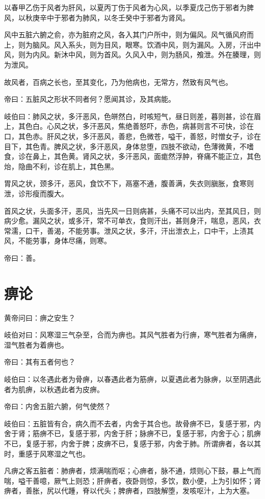 \documentclass{article}%
\begin{document}
以春甲乙伤于风者为肝风，以夏丙丁伤于风者为心风，以季夏戊己伤于邪者为脾风，以秋庚辛中于邪者为肺风，以冬壬癸中于邪者为肾风。

风中五脏六腑之俞，亦为脏府之风，各入其门户所中，则为偏风。风气循风府而上，则为脑风。风入系头，则为目风，眼寒。饮酒中风，则为漏风。入房，汗出中风，则为内风。新沐中风，则为首风。久风入中，则为肠风，飧泄。外在腠理，则为泄风。

故风者，百病之长也，至其变化，乃为他病也，无常方，然致有风气也。

帝曰：五脏风之形状不同者何？愿闻其诊，及其病能。

岐伯曰：肺风之状，多汗恶风，色皏然白，时咳短气，昼日则差，暮则甚，诊在眉上，其色白。心风之状，多汗恶风，焦绝善怒吓，赤色，病甚则言不可快，诊在口，其色赤。肝风之状，多汗恶风，善悲，色微苍，嗌干，善怒，时憎女子，诊在目下，其色青。脾风之状，多汗恶风，身体怠堕，四肢不欲动，色薄微黄，不嗜食，诊在鼻上，其色黄。肾风之状，多汗恶风，面痝然浮肿，脊痛不能正立，其色炲，隐曲不利，诊在肌上，其色黑。

胃风之状，颈多汗，恶风，食饮不下，鬲塞不通，腹善满，失衣则䐜胀，食寒则泄，诊形瘦而腹大。

首风之状，头面多汗，恶风，当先风一日则病甚，头痛不可以出内，至其风日，则病少愈。漏风之状，或多汗，常不可单衣，食则汗出，甚则身汗，喘息，恶风，衣常濡，口干，善渴，不能劳事。泄风之状，多汗，汗出泄衣上，口中干，上渍其风，不能劳事，身体尽痛，则寒。

帝曰：善。
\section{痹论}
黄帝问曰：痹之安生？

岐伯对曰：风寒湿三气杂至，合而为痹也。其风气胜者为行痹，寒气胜者为痛痹，湿气胜者为着痹也。

帝曰：其有五者何也？

岐伯曰：以冬遇此者为骨痹，以春遇此者为筋痹，以夏遇此者为脉痹，以至阴遇此者为肌痹，以秋遇此者为皮痹。

帝曰：内舍五脏六腑，何气使然？

岐伯曰：五脏皆有合，病久而不去者，内舍于其合也。故骨痹不已，复感于邪，内舍于肾；筋痹不已，复感于邪，内舍于肝；脉痹不已，复感于邪，内舍于心；肌痹不已，复感于邪，内舍于脾；皮痹不已，复感于邪，内舍于肺。所谓痹者，各以其时，重感于风寒湿之气也。

凡痹之客五脏者：肺痹者，烦满喘而呕；心痹者，脉不通，烦则心下鼓，暴上气而喘，嗌干善噫，厥气上则恐；肝痹者，夜卧则惊，多饮，数小便，上为引如怀；肾痹者，善胀，尻以代踵，脊以代头；脾痹者，四肢解堕，发咳呕汁，上为大塞。
\end{document}
